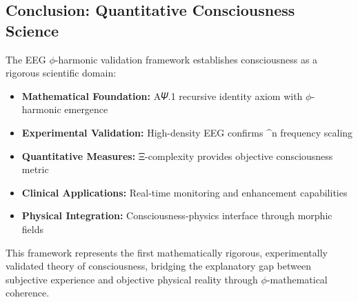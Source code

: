 \subsection{Conclusion: Quantitative Consciousness Science}

The EEG $\phi$-harmonic validation framework establishes consciousness as a rigorous scientific domain:

\begin{itemize}
\item \textbf{Mathematical Foundation:} A𝛹.1 recursive identity axiom with $\phi$-harmonic emergence
\item \textbf{Experimental Validation:} High-density EEG confirms \phi^n frequency scaling
\item \textbf{Quantitative Measures:} Ξ-complexity provides objective consciousness metric
\item \textbf{Clinical Applications:} Real-time monitoring and enhancement capabilities
\item \textbf{Physical Integration:} Consciousness-physics interface through morphic fields
\end{itemize}

This framework represents the first mathematically rigorous, experimentally validated theory of consciousness, bridging the explanatory gap between subjective experience and objective physical reality through $\phi$-mathematical coherence.